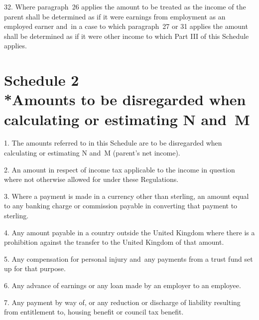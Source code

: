 \documentclass[12pt,a4paper]{article}
\begin{document}

\medskip

32.  Where paragraph~26 applies the amount to be treated as the income of the parent shall be determined as if it were earnings from employment as an employed earner and~in a case to which paragraph~27 or 31 applies the amount shall be determined as if it were other income to which Part III of this Schedule applies.

\part[Schedule 2 --- Amounts to be disregarded when calculating or estimating N and~M]{Schedule 2\\*Amounts to be disregarded when calculating or estimating N and~M}

\renewcommand\parthead{--- Schedule 2}

1.  The amounts referred to in this Schedule are to be disregarded when calculating or estimating N and~M (parent’s net income).

\medskip

2.  An amount in respect of income tax applicable to the income in question where not otherwise allowed for under these Regulations.

\medskip

3.  Where a payment is made in a currency other than sterling, an amount equal to any banking charge or commission payable in converting that payment to sterling.

\medskip

4.  Any amount payable in a country outside the United Kingdom where there is a prohibition against the transfer to the United Kingdom of that amount.

\medskip

5.  Any compensation for personal injury and~any payments from a trust fund set up for that purpose.

\medskip

6.  Any advance of earnings or any loan made by an employer to an employee.

\medskip

7.  Any payment by way of, or any reduction or discharge of liability resulting from entitlement to, housing benefit or council tax benefit.

\medskip
\end{document}
